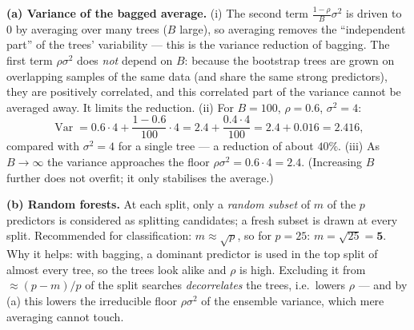 \documentclass[11pt,a4paper]{article}
\begin{document}
\ifdefined\withsolutions
\begin{solutionbox}
\textbf{(a) Variance of the bagged average.}
(i) The second term $\frac{1-\rho}{B}\sigma^2$ is driven to $0$ by averaging over many trees
($B$ large), so averaging removes the ``independent part'' of the trees' variability ---
this is the variance reduction of bagging. The first term $\rho\sigma^2$ does \emph{not}
depend on $B$: because the bootstrap trees are grown on overlapping samples of the same data
(and share the same strong predictors), they are positively correlated, and this correlated
part of the variance cannot be averaged away. It limits the reduction.
(ii) For $B=100$, $\rho=0.6$, $\sigma^2=4$:
\[
  \operatorname{Var}=0.6\cdot 4+\frac{1-0.6}{100}\cdot 4
  =2.4+\frac{0.4\cdot 4}{100}=2.4+0.016=\mathbf{2.416},
\]
compared with $\sigma^2=4$ for a single tree --- a reduction of about $40\%$.
(iii) As $B\to\infty$ the variance approaches the floor $\rho\sigma^2=0.6\cdot 4=\mathbf{2.4}$.
(Increasing $B$ further does not overfit; it only stabilises the average.)

\medskip
\textbf{(b) Random forests.}
At each split, only a \emph{random subset} of $m$ of the $p$ predictors is considered as
splitting candidates; a fresh subset is drawn at every split. Recommended for classification:
$m\approx\sqrt{p}$, so for $p=25$: $m=\sqrt{25}=\mathbf{5}$.
Why it helps: with bagging, a dominant predictor is used in the top split of almost every tree,
so the trees look alike and $\rho$ is high. Excluding it from $\approx (p-m)/p$ of the split
searches \emph{decorrelates} the trees, i.e.\ lowers $\rho$ --- and by (a) this lowers the
irreducible floor $\rho\sigma^2$ of the ensemble variance, which mere averaging cannot touch.


\end{solutionbox}
\end{document}
